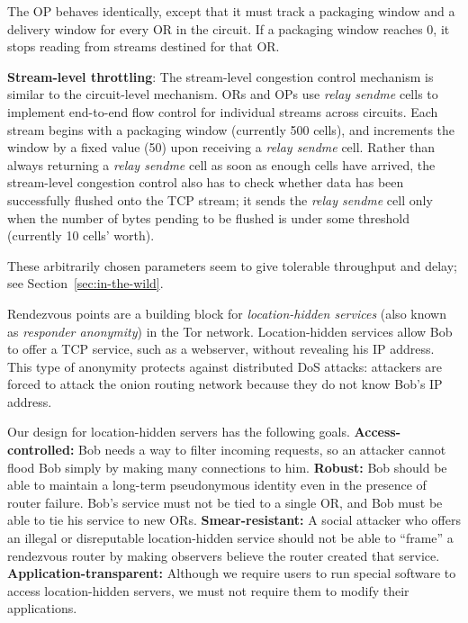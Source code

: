\documentclass[times,10pt,twocolumn]{article}
\begin{document}
The OP behaves identically, except that it must track a packaging window
and a delivery window for every OR in the circuit. If a packaging window
reaches 0, it stops reading from streams destined for that OR.

\textbf{Stream-level throttling}:
The stream-level congestion control mechanism is similar to the
circuit-level mechanism. ORs and OPs use \emph{relay sendme} cells
to implement end-to-end flow control for individual streams across
circuits. Each stream begins with a packaging window (currently 500 cells),
and increments the window by a fixed value (50) upon receiving a \emph{relay
sendme} cell. Rather than always returning a \emph{relay sendme} cell as soon
as enough cells have arrived, the stream-level congestion control also
has to check whether data has been successfully flushed onto the TCP
stream; it sends the \emph{relay sendme} cell only when the number of bytes pending
to be flushed is under some threshold (currently 10 cells' worth).


These arbitrarily chosen parameters seem to give tolerable throughput
and delay; see Section~\ref{sec:in-the-wild}.

\label{subsec:rendezvous}

Rendezvous points are a building block for \emph{location-hidden
services} (also known as \emph{responder anonymity}) in the Tor
network.  Location-hidden services allow Bob to offer a TCP
service, such as a webserver, without revealing his IP address.
This type of anonymity protects against distributed DoS attacks:
attackers are forced to attack the onion routing network
because they do not know Bob's IP address.

Our design for location-hidden servers has the following goals.
\textbf{Access-controlled:} Bob needs a way to filter incoming requests,
so an attacker cannot flood Bob simply by making many connections to him.
\textbf{Robust:} Bob should be able to maintain a long-term pseudonymous
identity even in the presence of router failure. Bob's service must
not be tied to a single OR, and Bob must be able to tie his service
to new ORs. \textbf{Smear-resistant:}
A social attacker who offers an illegal or disreputable location-hidden
service should not be able to ``frame'' a rendezvous router by
making observers believe the router created that service.
\textbf{Application-transparent:} Although we require users
to run special software to access location-hidden servers, we must not
require them to modify their applications.
\end{document}
